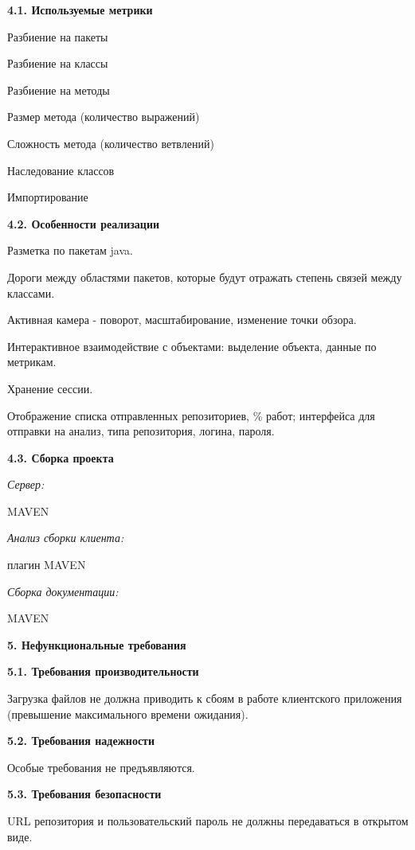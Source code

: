 \documentclass[a4paper,12pt]{article}
\begin{document}
	\textbf{4.1.	Используемые метрики}
	\newline
	
	Разбиение на пакеты
	
	Разбиение на классы
	
	Разбиение на методы
	
	Размер метода (количество выражений)
	
	Сложность метода (количество ветвлений)
	
	Наследование классов
	
	Импортирование
	\newline
	
	\textbf{4.2.	Особенности реализации}
	\newline
	
		Разметка по пакетам java.
		
		Дороги между областями пакетов, которые будут отражать степень связей между классами.
		
		Активная камера - поворот, масштабирование, изменение точки обзора.
		
		Интерактивное взаимодействие с объектами: выделение объекта, данные по метрикам.

		Хранение сессии.

		Отображение списка отправленных репозиториев, \% работ; интерфейса для отправки на анализ, типа репозитория, логина, пароля.
		\newline
		
	\textbf{4.3.	Сборка проекта}
	\newline
	
	\textit{Сервер:}
	
	MAVEN
	\newline
	
	\textit{Анализ сборки клиента:}
	
	плагин MAVEN
	\newline
	
	\textit{Сборка документации:}
	
	MAVEN

\maketitle
\newpage
\textbf{5. Нефункциональные требования}
\newline

	\textbf{5.1.	Требования производительности}
	
		Загрузка файлов не должна приводить к сбоям в работе клиентского приложения (превышение максимального времени ожидания).
		\newline
		
	\textbf{5.2.	Требования надежности}
	
		Особые требования не предъявляются.
	\newline
	
	\textbf{5.3.	Требования безопасности}
	
		URL репозитория и пользовательский пароль не должны передаваться в открытом виде.
	\newline
\end{document}
